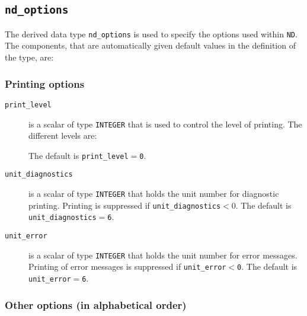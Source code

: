 \subsection{\texttt{nd\_options}}
\label{nd:type:options}

The derived data type {\tt nd\_options} is used to specify the options used
within \texttt{ND}. The components, that are automatically
given default values in the definition of the type, are: \\

\subsubsection*{Printing options}

\begin{description}

\item[\texttt{print\_level}] is a scalar of type  {\tt INTEGER}
that is used to control the level of printing. The different levels are:
The default is {\tt print\_level$=$\tt 0}.

\item[\texttt{unit\_diagnostics}] is a scalar  of type
{\tt INTEGER} that holds the
unit number for diagnostic printing. Printing is suppressed if
{\tt unit\_diagnostics$<0$}.
The default is {\tt unit\_diagnostics$=$6}.

\item[\texttt{unit\_error}] is a scalar of type  {\tt INTEGER} that holds the
unit number for error messages.
Printing of error messages
is suppressed if {\tt unit\_error$<$0}.
The default is {\tt unit\_error$=$6}.

\end{description}



\subsubsection*{Other options (in alphabetical order)}

